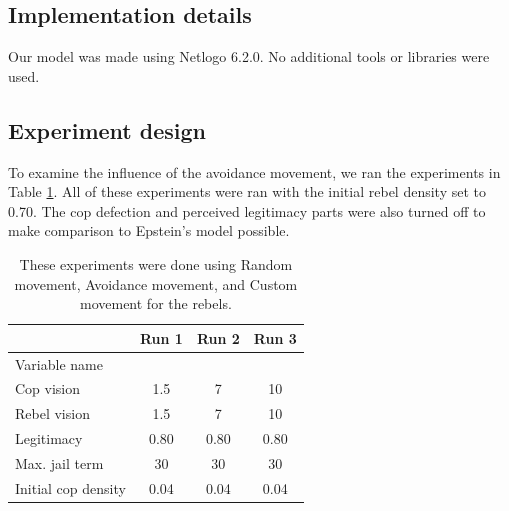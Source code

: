 \documentclass[a4paper,11pt]{article}
\begin{document}
\subsection{Implementation details}

Our model was made using Netlogo 6.2.0. No additional tools or libraries were used.

\subsection{Experiment design}
To examine the influence of the avoidance movement, we ran the experiments in Table \ref{tab:expAvoid}. All of these experiments were ran with the initial rebel density set to 0.70. The cop defection and perceived legitimacy parts were also turned off to make comparison to Epstein's model possible.
\begin{table}[h]
\centering
\begin{tabular}{lccc}
\cline{2-4}
 & Run 1 & Run 2 & Run 3 \\ \hline
Variable name & \multicolumn{1}{l}{} & \multicolumn{1}{l}{} & \multicolumn{1}{l}{} \\
Cop vision & 1.5 & 7 & 10 \\
Rebel vision & 1.5 & 7 & 10 \\
Legitimacy & 0.80 & 0.80 & 0.80 \\
Max. jail term & 30 & 30 & 30 \\
Initial cop density & 0.04 & 0.04 & 0.04
\end{tabular}
\caption{These experiments were done using Random movement, Avoidance movement, and Custom movement for the rebels.}
\label{tab:expAvoid}
\end{table}

\end{document}
